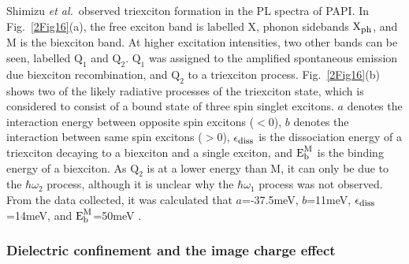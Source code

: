 Shimizu \textit{et al.}\ observed triexciton formation in the PL spectra of PAPI. In Fig.\ \ref{2Fig16}(a), the free exciton band is labelled X, phonon sidebands $\textrm{X}_{\textrm{\footnotesize ph}}$, and M is the biexciton band. At higher excitation intensities, two other bands can be seen, labelled $\textrm{Q}_1$ and $\textrm{Q}_2$. $\textrm{Q}_1$ was assigned to the amplified spontaneous emission due biexciton recombination, and $\textrm{Q}_2$ to a triexciton process. Fig.\ \ref{2Fig16}(b) shows two of the likely radiative processes of the triexciton state, which is considered to consist of a bound state of three spin singlet excitons. $a$ denotes the interaction energy between opposite spin excitons ($<0$), $b$ denotes the interaction between same spin excitons ($>0$), $\epsilon_{\textrm{\footnotesize diss}}$ is the dissociation energy of a triexciton decaying to a biexciton and a single exciton, and $\textrm{E}_{\textrm{\footnotesize b}}^{\textrm{\footnotesize M}}$ is the binding energy of a biexciton. As $\textrm{Q}_2$ is at a lower energy than M, it can only be due to the $\hbar \omega_2$ process, although it is unclear why the $\hbar \omega_1$ process was not observed. From the data collected, it was calculated that $a$=-37.5meV, $b$=11meV, $\epsilon_{\textrm{\footnotesize diss}}$=14meV, and $\textrm{E}_{\textrm{\footnotesize b}}^{\textrm{\footnotesize M}}$=50meV \cite{Shimizu2006a}. 


\subsubsection{Dielectric confinement and the image charge effect}


